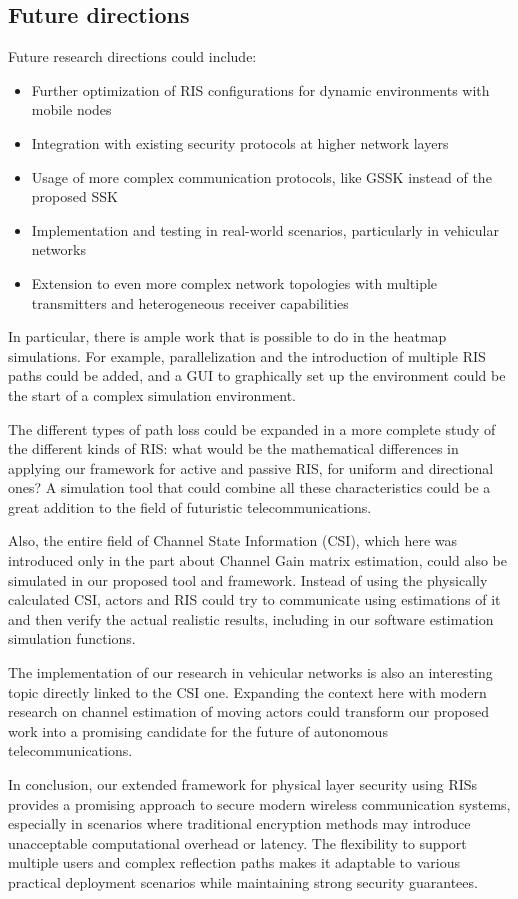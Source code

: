 \subsection{Future directions}

Future research directions could include:
\begin{itemize}
  \item Further optimization of RIS configurations for dynamic environments with mobile nodes
  \item Integration with existing security protocols at higher network layers
  \item Usage of more complex communication protocols, like GSSK \cite{4699782} instead of the proposed SSK \cite{5165332}
  \item Implementation and testing in real-world scenarios, particularly in vehicular networks
  \item Extension to even more complex network topologies with multiple transmitters and heterogeneous receiver capabilities
\end{itemize}

In particular, there is ample work that is possible to do in the heatmap simulations. For example, parallelization and the introduction of multiple RIS paths could be added, and a GUI to graphically set up the environment could be the start of a complex simulation environment.

The different types of path loss could be expanded in a more complete study of the different kinds of RIS: what would be the mathematical differences in applying our framework for active and passive RIS, for uniform and directional ones? A simulation tool that could combine all these characteristics could be a great addition to the field of futuristic telecommunications.

Also, the entire field of Channel State Information (CSI), which here was introduced only in the part about Channel Gain matrix estimation, could also be simulated in our proposed tool and framework. Instead of using the physically calculated CSI, actors and RIS could try to communicate using estimations of it and then verify the actual realistic results, including in our software estimation simulation functions.

The implementation of our research in vehicular networks is also an interesting topic directly linked to the CSI one. Expanding the context here with modern research on channel estimation of moving actors could transform our proposed work into a promising candidate for the future of autonomous telecommunications.

In conclusion, our extended framework for physical layer security using RISs provides a promising approach to secure modern wireless communication systems, especially in scenarios where traditional encryption methods may introduce unacceptable computational overhead or latency. The flexibility to support multiple users and complex reflection paths makes it adaptable to various practical deployment scenarios while maintaining strong security guarantees.
